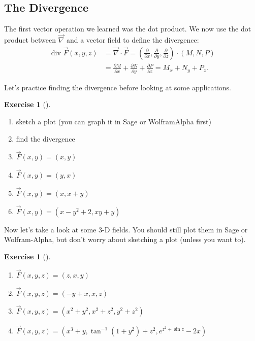 \documentclass[10pt,]{book}
\theoremstyle{plain}
\theoremstyle{definition}
\theoremstyle{definition}
\theoremstyle{definition}
\theoremstyle{definition}
\newtheorem{exploration}[project]{Exercise}
\theoremstyle{definition}
\numberwithin{equation}{section}
\newcommand{\amp}{&}
\begin{document}
\subsection[{The Divergence}]{The Divergence}\label{subsection-37}
The first vector operation we learned was the dot product. We now use the dot product between \(\vec \nabla\) and a vector field to define the divergence:%
\begin{align*}
\text{ div } \vec F(x,y,z) 
\amp = \vec \nabla\cdot \vec F 
= \left(\frac{\partial }{\partial x},\frac{\partial }{\partial y},\frac{\partial }{\partial z} \right)\cdot (M,N,P)\\
\amp = \frac{\partial M}{\partial x}+\frac{\partial N}{\partial y}+\frac{\partial P}{\partial z} 
= M_x+N_y+P_z 
.
\end{align*}
%
\par
Let's practice finding the divergence before looking at some applications.%
\begin{exploration}[]\label{x2d_div}
\leavevmode%
\begin{enumerate}[font=\bfseries,label=(\alph*),ref=\alph*]
\item\label{task-776} sketch a plot (you can graph it in Sage or WolframAlpha first)  %
\item\label{task-777} find the divergence%
\item\label{task-778} \(\vec{F}(x,y)=(x,y)\)%
\item\label{task-779} \(\vec{F}(x,y)=(y,x)\)%
\item\label{task-780} \(\vec{F}(x,y)=(x,x+y)\)%
\item\label{task-781} \(\vec{F}(x,y)=(x-y^2+2, xy+y)\)%
\end{enumerate}
\end{exploration}
Now let's take a look at some 3-D fields. You should still plot them in Sage or Wolfram-Alpha, but don't worry about sketching a plot (unless you want to).%
\begin{exploration}[]\label{x3d_div}
\leavevmode%
\begin{enumerate}[font=\bfseries,label=(\alph*),ref=\alph*]
\item\label{task-782} \(\vec F(x,y,z) = \left(z,x,y \right)\)%
\item\label{task-783} \(\vec F(x,y,z) = \left(-y+x,x,z \right)\)%
\item\label{task-784} \(\vec F(x,y,z) = \left(x^2+y^2,x^2+z^2,y^2+z^2 \right)\)%
\item\label{task-785} \(\vec F(x,y,z) = \left(x^3+y,\tan^{-1}(1+y^2) + z^2,e^{z^2+\sin z} -2x\right)\)%
\end{enumerate}
\end{exploration}
\typeout{************************************************}
\typeout{************************************************}
\end{document}
